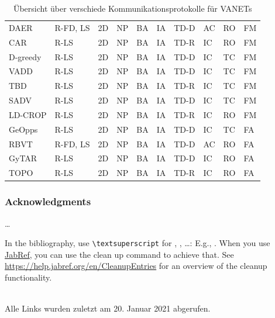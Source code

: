 \documentclass[english,runningheads,a4paper]{llncs}[2018/03/10]
\begin{document}
\begin{table}[]
\begin{tabular}{llllllllll}
    DAER                          & R-FD, LS & 2D & NP    & BA & IA     & TD-D     & AC    & RO & FM \\
    CAR                           & R-LS     & 2D & NP    & BA & IA     & TD-R     & IC    & RO & FM \\
    D-greedy                      & R-LS     & 2D & NP    & BA & IA     & TD-D     & IC    & TC & FM \\
    VADD                          & R-LS     & 2D & NP    & BA & IA     & TD-D     & IC    & TC & FM \\
    TBD                           & R-LS     & 2D & NP    & BA & IA     & TD-R     & IC    & TC & FM \\
    SADV                          & R-LS     & 2D & NP    & BA & IA     & TD-D     & IC    & TC & FM \\
    LD-CROP                       & R-LS     & 2D & NP    & BA & IA     & TD-R     & IC    & RO & FM \\
    GeOpps                        & R-LS     & 2D & NP    & BA & IA     & TD-D     & IC    & TC & FA \\
    RBVT                          & R-FD, LS & 2D & NP    & BA & IA     & TD-D     & AC    & RO & FA \\
    GyTAR                         & R-LS     & 2D & NP    & BA & IA     & TD-D     & IC    & RO & FA \\
    TOPO                          & R-LS     & 2D & NP    & BA & IA     & TD-R     & IC    & RO & FA
  \end{tabular}
  \caption{Übersicht über verschiede Kommunikationsprotokolle für VANETs\cite{conti2013mobile}}
  \label{table:1}
\end{table}

\subsubsection*{Acknowledgments}
\ldots

In the bibliography, use \texttt{\textbackslash textsuperscript} for , , \ldots:
E.g., .
When you use \href{https://www.jabref.org}{JabRef}, you can use the clean up command to achieve that.
See \url{https://help.jabref.org/en/CleanupEntries} for an overview of the cleanup functionality.

\renewcommand{\bibsection}{\section*{References}} %

\begingroup
  \ifluatex
  \else
  \fi
  \small %
  
\endgroup

\ \\
%
Alle Links wurden zuletzt am 20. Januar 2021 abgerufen.
\end{document}
